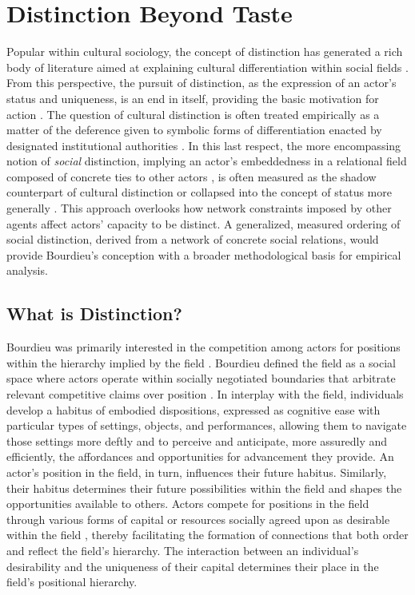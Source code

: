\documentclass[12pt]{article}
\begin{document}
\section{Distinction Beyond Taste}
Popular within cultural sociology, the concept of distinction has generated a rich body of literature aimed at explaining cultural differentiation within social fields \citep{anheier1995forms, bennett2009culture-aef}. From this perspective, the pursuit of distinction, as the expression of an actor's status and uniqueness, is an end in itself, providing the basic motivation for action \citep{martin2003field}. The question of cultural distinction is often treated empirically as a matter of the deference given to symbolic forms of differentiation enacted by designated institutional authorities \citep{bourdieu1984distinction, bourdieu1993field-8ad}. In this last respect, the more encompassing notion of \textit{social} distinction, implying an actor's embeddedness in a relational field composed of concrete ties to other actors \citep{erikson2013formalist-400, fuhse2021social-9cb}, is often measured as the shadow counterpart of cultural distinction or collapsed into the concept of status more generally \citep{podolny2010status-1a6}. This approach overlooks how network constraints imposed by other agents affect actors' capacity to be distinct. A generalized, measured ordering of social distinction, derived from a network of concrete social relations, would provide Bourdieu's conception with a broader methodological basis for empirical analysis. 

\subsection{What is Distinction?}
Bourdieu was primarily interested in the competition among actors for positions within the hierarchy implied by the field \citep{anheier1995forms, bourdieu1993field-8ad}. Bourdieu defined the field as a social space where actors operate within socially negotiated boundaries that arbitrate relevant competitive claims over position \citep{bourdieu1996rules-393}. In interplay with the field, individuals develop a habitus of embodied dispositions, expressed as cognitive ease with particular types of settings, objects, and performances, allowing them to navigate those settings more deftly and to perceive and anticipate, more assuredly and efficiently, the affordances and opportunities for advancement they provide. An actor's position in the field, in turn, influences their future habitus. Similarly, their habitus determines their future possibilities within the field and shapes the opportunities available to others. Actors compete for positions in the field through various forms of capital or resources socially agreed upon as desirable within the field \citep{martin2003field}, thereby facilitating the formation of connections that both order and reflect the field's hierarchy. The interaction between an individual's desirability and the uniqueness of their capital determines their place in the field's positional hierarchy.   
\end{document}
